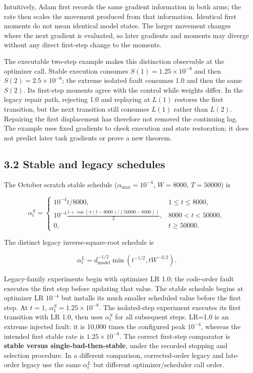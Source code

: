 \documentclass[smallextended]{svjour3}
\begin{document}
Intuitively, Adam first records the same gradient information in both arms; the rate then scales the movement produced from that information. Identical first moments do not mean identical model states. The larger movement changes where the next gradient is evaluated, so later gradients and moments may diverge without any direct first-step change to the moments.

The executable two-step example makes this distinction observable at the optimizer call. Stable execution consumes \(S(1)=1.25\times10^{-8}\) and then \(S(2)=2.5\times10^{-8}\); the extreme isolated fault consumes 1.0 and then the same \(S(2)\). Its first-step moments agree with the control while weights differ. In the legacy repair path, rejecting 1.0 and replaying at \(L(1)\) restores the first transition, but the next transition still consumes \(L(1)\) rather than \(L(2)\). Repairing the first displacement has therefore not removed the continuing lag. The example uses fixed gradients to check execution and state restoration; it does not predict later task gradients or prove a new theorem.

\subsection{3.2 Stable and legacy schedules}\label{stable-and-legacy-schedules}

The October scratch stable schedule (\(\alpha_{\max}=10^{-4}\), \(W=8000\), \(T=50000\)) is

\[
\alpha_t^{S}=\begin{cases}
10^{-4}t/8000,&1\le t\le8000,\\
10^{-4}\frac{1+\cos(\pi(t-8000)/(50000-8000))}{2},&8000<t<50000,\\
0,&t\ge50000.
\end{cases}\tag{3}
\]

The distinct legacy inverse-square-root schedule is

\[
\alpha_t^L=d_{\mathrm{model}}^{-1/2}\min(t^{-1/2},tW^{-3/2}).\tag{4}
\]

Legacy-family experiments begin with optimizer LR 1.0; the code-order fault executes the first step before updating that value. The stable schedule begins at optimizer LR \(10^{-4}\) but installs its much smaller scheduled value before the first step. At \(t=1\), \(\alpha_1^S=1.25\times10^{-8}\). The isolated-step experiment executes its first transition with LR 1.0, then uses \(\alpha_t^S\) for all subsequent steps. LR=1.0 is an extreme injected fault: it is 10,000 times the configured peak \(10^{-4}\), whereas the intended first stable rate is \(1.25\times10^{-8}\). The correct first-step comparator is \textbf{stable versus single-bad-then-stable}, under the recorded stopping and selection procedure. In a different comparison, corrected-order legacy and late-order legacy use the same \(\alpha^L_t\) but different optimizer/scheduler call order.
\end{document}
